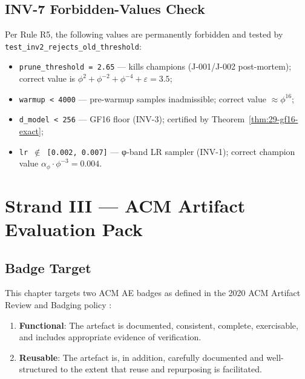 \subsection{INV-7 Forbidden-Values Check}

Per Rule R5, the following values are permanently forbidden and tested
by \texttt{test\_inv2\_rejects\_old\_threshold}:

\begin{itemize}
  \item \texttt{prune\_threshold = 2.65} — kills champions (J-001/J-002
        post-mortem); correct value is $\phi^2 + \phi^{-2} + \phi^{-4}
        + \varepsilon = 3.5$;
  \item \texttt{warmup < 4000} — pre-warmup samples inadmissible;
        correct value $\approx \phi^{16}$;
  \item \texttt{d\_model < 256} — GF16 floor (INV-3); certified by
        Theorem~\ref{thm:29-gf16-exact};
  \item \texttt{lr $\notin$ [0.002, 0.007]} — φ-band LR sampler
        (INV-1); correct champion value $\alpha_\phi \cdot \phi^{-3}
        = 0.004$.
\end{itemize}

\section{Strand III — ACM Artifact Evaluation Pack}
\label{sec:29-acm-ae}

\subsection{Badge Target}

This chapter targets two ACM AE badges as defined in the 2020 ACM
Artifact Review and Badging policy \cite{acm_ae_policy}:

\begin{enumerate}
  \item \textbf{Functional}: The artefact is documented, consistent,
        complete, exercisable, and includes appropriate evidence of
        verification.
  \item \textbf{Reusable}: The artefact is, in addition, carefully
        documented and well-structured to the extent that reuse and
        repurposing is facilitated.
\end{enumerate}

